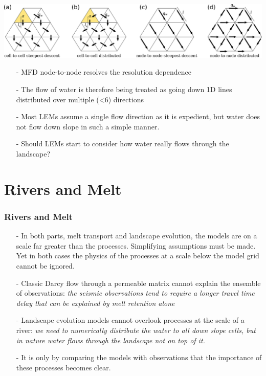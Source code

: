 \documentclass[aspectratio=169]{beamer}
\begin{document}
\begin{frame}
    \includegraphics[width=0.8\paperwidth]{./figures/MFDandSFD.png}
    \begin{itemize}
        \item[-]{MFD node-to-node resolves the resolution dependence}
        \item[-]{The flow of water is therefore being treated as going down 1D lines distributed over multiple (<6) directions}
        \item[-]{Most LEMs assume a single flow direction as it is expedient, but water does not flow down slope in such a simple manner.}
        \item[-]{Should LEMs start to consider how water really flows through the landscape?}
    \end{itemize}
\end{frame}

\section{Rivers and Melt}

\begin{frame}
    \frametitle{Rivers and Melt}
    \begin{itemize}
        \item[-]{In both parts, melt transport and landscape evolution, the models are on a scale far greater than the processes.
                 Simplifying assumptions must be made. Yet in both cases the physics of the processes at a scale below the model grid cannot be ignored.}
        \item[-]{Classic Darcy flow through a permeable matrix cannot explain the ensemble of observations: \newline
                 \textit{the seismic observations tend to require a longer travel time delay that can be explained by melt retention alone}}
        \item[-]{Landscape evolution models cannot overlook processes at the scale of a river: \newline
                 \textit{we need to numerically distribute the water to all down slope cells, but in nature water flows through the landscape not on top of it.}}
        \item[-]{It is only by comparing the models with observations that the importance of these processes becomes clear.}
    \end{itemize}
\end{frame}
\end{document}
